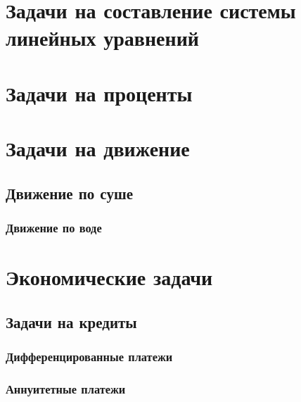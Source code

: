 \documentclass[10pt, a4paper]{article}
\begin{document}
	\section{Задачи на составление системы линейных уравнений}
	\section{Задачи на проценты}
	\section{Задачи на движение}
		\subsection{Движение по суше}
		\subsubsection{Движение по воде}
	\section{Экономические задачи}
		\subsection{Задачи на кредиты}
			\subsubsection{Дифференцированные платежи}
			\subsubsection{Аннуитетные платежи}
\end{document}
